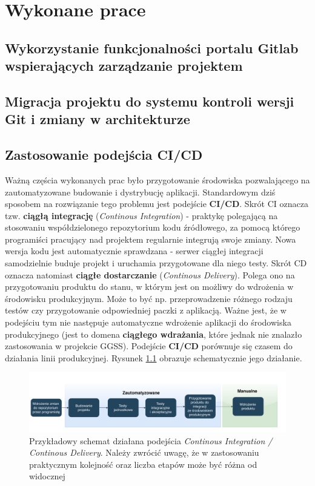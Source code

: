\chapter{Wykonane prace}
\label{cha:prace}

\section{Wykorzystanie funkcjonalności portalu Gitlab wspierających zarządzanie projektem}

\section{Migracja projektu do systemu kontroli wersji Git i zmiany w architekturze}

\section{Zastosowanie podejścia CI/CD}
Ważną częścia wykonanych prac było przygotowanie środowiska pozwalającego na zautomatyzowane budowanie i dystrybucję aplikacji. Standardowym dziś sposobem na rozwiązanie tego problemu jest podejście \textbf{CI/CD}. Skrót CI oznacza tzw. \textbf{ciągłą integrację} (\textit{Continous Integration}) - praktykę polegającą na stosowaniu współdzielonego repozytorium kodu źródłowego, za pomocą którego programiści pracujący nad projektem regularnie integrują swoje zmiany. Nowa wersja kodu jest automatycznie sprawdzana - serwer ciągłej integracji samodzielnie buduje projekt i uruchamia przygotowane dla niego testy. Skrót CD oznacza natomiast \textbf{ciągłe dostarczanie} (\textit{Continous Delivery}). Polega ono na przygotowaniu produktu do stanu, w którym jest on możliwy do wdrożenia w środowisku produkcyjnym. Może to być np. przeprowadzenie różnego rodzaju testów czy przygotowanie odpowiedniej paczki z aplikacją. Ważne jest, że w podejściu tym nie następuje automatyczne wdrożenie aplikacji do środowiska produkcyjnego (jest to domena \textbf{ciągłego wdrażania}, które jednak nie znalazło zastosowania w projekcie GGSS). Podejście \textbf{CI/CD} porównuje się czasem do działania linii produkcyjnej. Rysunek \ref{fig:cicd} obrazuje schematycznie jego działanie. 

\begin{figure}[H]
\centering
\caption{Przykładowy schemat działana podejścia \textit{Continous Integration / Continous Delivery}. Należy zwrócić uwagę, że w zastosowaniu praktycznym kolejność oraz liczba etapów może być różna od widocznej}
\label{fig:cicd}
\includegraphics[width=\textwidth]{res/CICD.pdf}
\end{figure}

